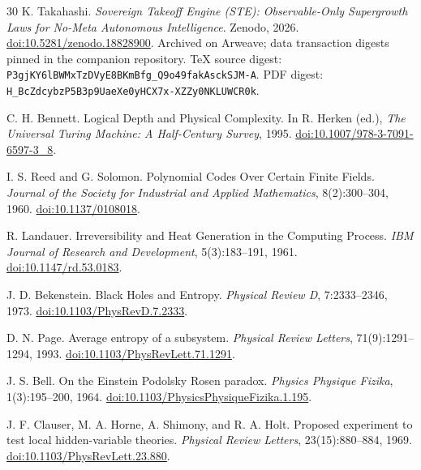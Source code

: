 \documentclass[11pt]{article}
\theoremstyle{definition}
\theoremstyle{plain}
\begin{document}
\begin{thebibliography}{30}
K. Takahashi.
\newblock \emph{Sovereign Takeoff Engine (STE): Observable-Only Supergrowth Laws for No-Meta Autonomous Intelligence}.
\newblock Zenodo, 2026.
\newblock \href{https://doi.org/10.5281/zenodo.18828900}{doi:10.5281/zenodo.18828900}.
\newblock Archived on Arweave; data transaction digests pinned in the companion repository.
\newblock TeX source digest: \nolinkurl{P3gjKY6lBWMxTzDVyE8BKmBfg_Q9o49fakAsckSJM-A}.
\newblock PDF digest: \nolinkurl{H_BcZdcybzP5B3p9UaeXe0yHCX7x-XZZy0NKLUWCR0k}.

C. H. Bennett.
\newblock Logical Depth and Physical Complexity.
\newblock In R. Herken (ed.), \emph{The Universal Turing Machine: A Half-Century Survey}, 1995.
\newblock \href{https://doi.org/10.1007/978-3-7091-6597-3_8}{doi:10.1007/978-3-7091-6597-3\_8}.

I. S. Reed and G. Solomon.
\newblock Polynomial Codes Over Certain Finite Fields.
\newblock \emph{Journal of the Society for Industrial and Applied Mathematics}, 8(2):300--304, 1960.
\newblock \href{https://doi.org/10.1137/0108018}{doi:10.1137/0108018}.

R. Landauer.
\newblock Irreversibility and Heat Generation in the Computing Process.
\newblock \emph{IBM Journal of Research and Development}, 5(3):183--191, 1961.
\newblock \href{https://doi.org/10.1147/rd.53.0183}{doi:10.1147/rd.53.0183}.

J. D. Bekenstein.
\newblock Black Holes and Entropy.
\newblock \emph{Physical Review D}, 7:2333--2346, 1973.
\newblock \href{https://doi.org/10.1103/PhysRevD.7.2333}{doi:10.1103/PhysRevD.7.2333}.

D. N. Page.
\newblock Average entropy of a subsystem.
\newblock \emph{Physical Review Letters}, 71(9):1291--1294, 1993.
\newblock \href{https://doi.org/10.1103/PhysRevLett.71.1291}{doi:10.1103/PhysRevLett.71.1291}.

J. S. Bell.
\newblock On the Einstein Podolsky Rosen paradox.
\newblock \emph{Physics Physique Fizika}, 1(3):195--200, 1964.
\newblock \href{https://doi.org/10.1103/PhysicsPhysiqueFizika.1.195}{doi:10.1103/PhysicsPhysiqueFizika.1.195}.

J. F. Clauser, M. A. Horne, A. Shimony, and R. A. Holt.
\newblock Proposed experiment to test local hidden-variable theories.
\newblock \emph{Physical Review Letters}, 23(15):880--884, 1969.
\newblock \href{https://doi.org/10.1103/PhysRevLett.23.880}{doi:10.1103/PhysRevLett.23.880}.


\end{thebibliography}
\end{document}
